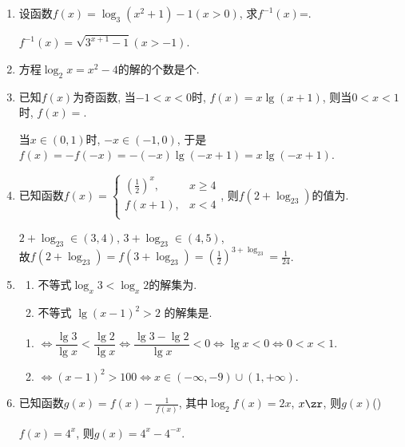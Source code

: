 \begin{enumerate}
\item 设函数$f(x)=\log_3(x^2+1)-1(x>0)$, 求$f^{-1}(x)$=.
\begin{jieda}
$f^{-1}(x)=\sqrt{3^{x+1}-1}(x>-1)$. 
\end{jieda}


\item 方程$\log_2 x=x^2-4$的解的个数是个. 


\item 已知$f(x)$为奇函数, 当$-1<x<0$时, $f(x)=x\lg(x+1)$, 则当$0<x<1$时, $f(x)=$. 
\begin{jieda}
当$x\in(0,1)$时, $-x\in(-1,0)$, 于是$f(x)=-f(-x)=-(-x)\lg(-x+1)=x\lg(-x+1)$. 
\end{jieda}


\item 已知函数$f(x)=\begin{cases}
(\frac{1}{2})^x, & x\geq 4\\ 
f(x+1), & x<4\\ 
\end{cases}$, 则$f(2+\log_23)$的值为. 
\begin{jieda}
$2+\log_23\in(3,4)$, $3+\log_23\in(4,5)$, \\
故$f(2+\log_23)=f(3+\log_23)=(\frac{1}{2})^{3+\log_23}=\frac{1}{24}$. 
\end{jieda}


\item 
\begin{enumerate}
    \item 不等式$\log_x3<\log_x2$的解集为. 
    \item 不等式 $\lg (x-1)^2>2$ 的解集是.
\end{enumerate}
\begin{jieda}
\begin{enumerate}
    \item $\iff\dfrac{\lg3}{\lg{x}}<\dfrac{\lg2}{\lg{x}}\iff\dfrac{\lg3-\lg2}{\lg{x}}<0\iff\lg{x}<0\iff 0<x<1$. 
    \item $\iff (x-1)^2 > 100 \iff x \in (-\infty, -9) \cup (1, +\infty)$. 
\end{enumerate}
\end{jieda}


\item 已知函数$g(x)=f(x)-\frac{1}{f(x)}$, 其中$\log_2f(x)=2x$, $x\zr$, 则$g(x)$\dotfill()
\begin{jieda}
$f(x)=4^x$, 则$g(x)=4^x-4^{-x}$. 
\end{jieda}



\end{enumerate}
